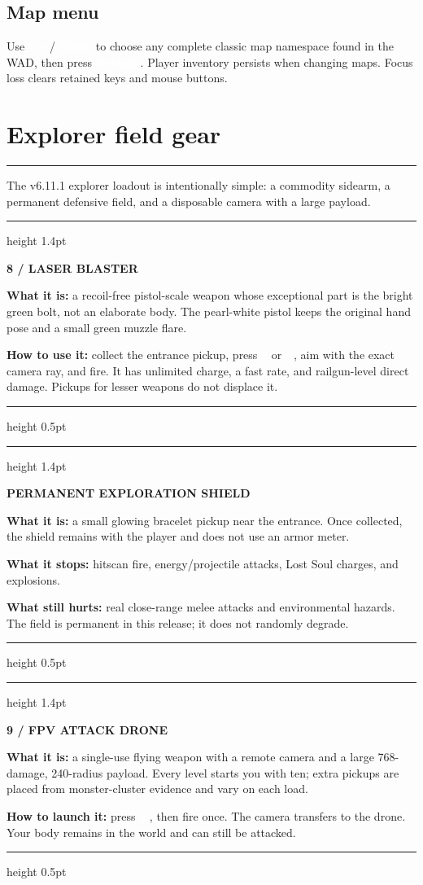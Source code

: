 \documentclass[10pt]{article}
\newcommand{\key}[1]{%
  \begingroup
  \setlength{\fboxsep}{2.5pt}%
  \colorbox{Ink}{\textcolor{white}{\sffamily\bfseries\footnotesize #1}}%
  \endgroup
}
\newenvironment{guidepanel}[2]{%
  \par\medskip
  \begingroup
  \def\GuidePanelAccent{#1}%
  \color{#1}\hrule height 1.4pt
  \vspace{5pt}%
  \color{Ink}%
  \noindent\begin{minipage}{\linewidth}
}{%
  \end{minipage}%
  \vspace{4pt}%
  \color{\GuidePanelAccent}\hrule height 0.5pt
  \endgroup
  \par\medskip
}
\newcommand{\sectionrule}[1]{%
  \vspace{2pt}
  {\color{#1}\rule{\linewidth}{1.5pt}}
}
\begin{document}
\subsection*{Map menu}

Use \key{Up} / \key{Down} to choose any complete classic map namespace found
in the WAD, then press \key{Return}. Player inventory persists when changing
maps. Focus loss clears retained keys and mouse buttons.

\newpage
\section*{Explorer field gear}
\sectionrule{LaserGreen}

The v6.11.1 explorer loadout is intentionally simple: a commodity sidearm, a
permanent defensive field, and a disposable camera with a large payload.

\begin{guidepanel}{LaserGreen}{PaleGreen}
{\sffamily\bfseries\large 8 / LASER BLASTER}\par
\textbf{What it is:} a recoil-free pistol-scale weapon whose exceptional part
is the bright green bolt, not an elaborate body. The pearl-white pistol keeps
the original hand pose and a small green muzzle flare.\par
\textbf{How to use it:} collect the entrance pickup, press \key{8} or \key{-},
aim with the exact camera ray, and fire. It has unlimited charge, a fast rate,
and railgun-level direct damage. Pickups for lesser weapons do not displace it.
\end{guidepanel}

\begin{guidepanel}{ShieldCyan}{PaleCyan}
{\sffamily\bfseries\large PERMANENT EXPLORATION SHIELD}\par
\textbf{What it is:} a small glowing bracelet pickup near the entrance. Once
collected, the shield remains with the player and does not use an armor meter.\par
\textbf{What it stops:} hitscan fire, energy/projectile attacks, Lost Soul
charges, and explosions.\par
\textbf{What still hurts:} real close-range melee attacks and environmental
hazards. The field is permanent in this release; it does not randomly degrade.
\end{guidepanel}

\begin{guidepanel}{DroneAmber}{PaleAmber}
{\sffamily\bfseries\large 9 / FPV ATTACK DRONE}\par
\textbf{What it is:} a single-use flying weapon with a remote camera and a
large 768-damage, 240-radius payload. Every level starts you with ten; extra
pickups are placed from monster-cluster evidence and vary on each load.\par
\textbf{How to launch it:} press \key{9}, then fire once. The camera transfers
to the drone. Your body remains in the world and can still be attacked.
\end{guidepanel}
\end{document}
